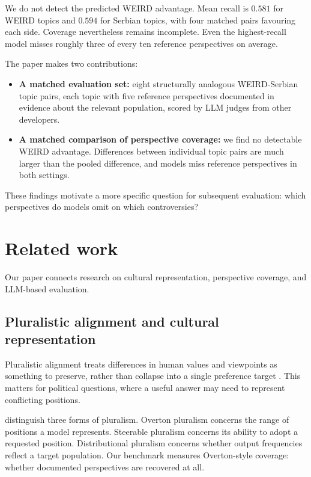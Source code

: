\documentclass[11pt,a4paper]{article}
\begin{document}
We do not detect the predicted WEIRD advantage. Mean recall is $0.581$ for WEIRD topics and $0.594$ for Serbian topics, with four matched pairs favouring each side. Coverage nevertheless remains incomplete. Even the highest-recall model misses roughly three of every ten reference perspectives on average.

The paper makes two contributions:
\begin{itemize}
\item \textbf{A matched evaluation set:} eight structurally analogous WEIRD-Serbian topic pairs, each topic with five reference perspectives documented in evidence about the relevant population, scored by LLM judges from other developers.
\item \textbf{A matched comparison of perspective coverage:} we find no detectable WEIRD advantage. Differences between individual topic pairs are much larger than the pooled difference, and models miss reference perspectives in both settings.
\end{itemize}

These findings motivate a more specific question for subsequent evaluation: which perspectives do models omit on which controversies?

\section{Related work}
\label{sec:Related work}
Our paper connects research on cultural representation, perspective coverage, and LLM-based evaluation.

\subsection{Pluralistic alignment and cultural representation}
\label{sec:Pluralistic alignment and cultural representation}
Pluralistic alignment treats differences in human values and viewpoints as something to preserve, rather than collapse into a single preference target \cite{sorensenRoadmapPluralisticAlignment2024, fengModularPluralismPluralistic2024, aliOperationalizingPluralisticValues2025}. This matters for political questions, where a useful answer may need to represent conflicting positions.

\citet{sorensenRoadmapPluralisticAlignment2024} distinguish three forms of pluralism. Overton pluralism concerns the range of positions a model represents. Steerable pluralism concerns its ability to adopt a requested position. Distributional pluralism concerns whether output frequencies reflect a target population. Our benchmark measures Overton-style coverage: whether documented perspectives are recovered at all.
\end{document}
